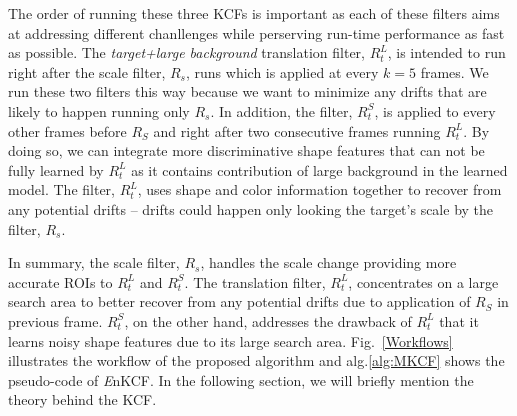 \documentclass{bmvc2k}
\begin{document}
The order of running these three KCFs is important as each of these
filters aims at addressing different chanllenges while perserving
run-time performance as fast as possible. The \textit{target+large
  background} translation filter, $R_{t}^{L}$, is intended to run
right after the scale filter, $R_s$, runs which is applied at every
$k=5$ frames. We run these two filters this way because we want to
minimize any drifts that are likely to happen running only $R_{s}$. In
addition, the filter, $R_{t}^{S}$, is applied to every other frames
before $R_{S}$ and right after two consecutive frames running
$R_{t}^{L}$. By doing so, we can integrate more discriminative shape
features that can not be fully learned by $R_{t}^{L}$ as it contains
contribution of large background in the learned model. The filter,
$R_{t}^{L}$, uses shape and color information together to recover from
any potential drifts -- drifts could happen only looking the target's
scale by the filter, $R_{s}$. 

In summary, the scale filter, $R_{s}$, handles the scale change providing more accurate
ROIs to $R_{t}^{L}$ and $R_{t}^{S}$. The translation filter, $R_{t}^{L}$, concentrates on a large search area to better recover from any potential drifts due to application of $R_{S}$ in previous frame. $R_{t}^{S}$, on the other hand, addresses the drawback of $R_{t}^{L}$ that it learns noisy shape features due to its large search area. Fig.~\ref{Workflows} illustrates the workflow of the
proposed algorithm and alg.\ref{alg:MKCF} shows the pseudo-code of
{\it E}nKCF. In the following section, we will briefly mention the theory behind the KCF.
\end{document}
